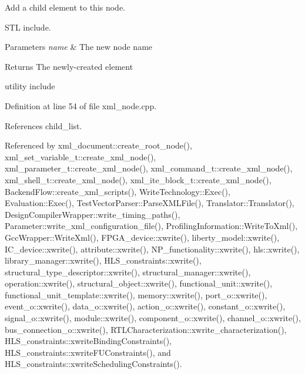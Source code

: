 Add a child element to this node. 

S\+TL include.


\begin{DoxyParams}{Parameters}
{\em name} & The new node name \\
\hline
\end{DoxyParams}
\begin{DoxyReturn}{Returns}
The newly-\/created element
\end{DoxyReturn}
utility include 

Definition at line 54 of file xml\+\_\+node.\+cpp.



References child\+\_\+list.



Referenced by xml\+\_\+document\+::create\+\_\+root\+\_\+node(), xml\+\_\+set\+\_\+variable\+\_\+t\+::create\+\_\+xml\+\_\+node(), xml\+\_\+parameter\+\_\+t\+::create\+\_\+xml\+\_\+node(), xml\+\_\+command\+\_\+t\+::create\+\_\+xml\+\_\+node(), xml\+\_\+shell\+\_\+t\+::create\+\_\+xml\+\_\+node(), xml\+\_\+ite\+\_\+block\+\_\+t\+::create\+\_\+xml\+\_\+node(), Backend\+Flow\+::create\+\_\+xml\+\_\+scripts(), Write\+Technology\+::\+Exec(), Evaluation\+::\+Exec(), Test\+Vector\+Parser\+::\+Parse\+X\+M\+L\+File(), Translator\+::\+Translator(), Design\+Compiler\+Wrapper\+::write\+\_\+timing\+\_\+paths(), Parameter\+::write\+\_\+xml\+\_\+configuration\+\_\+file(), Profiling\+Information\+::\+Write\+To\+Xml(), Gcc\+Wrapper\+::\+Write\+Xml(), F\+P\+G\+A\+\_\+device\+::xwrite(), liberty\+\_\+model\+::xwrite(), I\+C\+\_\+device\+::xwrite(), attribute\+::xwrite(), N\+P\+\_\+functionality\+::xwrite(), hls\+::xwrite(), library\+\_\+manager\+::xwrite(), H\+L\+S\+\_\+constraints\+::xwrite(), structural\+\_\+type\+\_\+descriptor\+::xwrite(), structural\+\_\+manager\+::xwrite(), operation\+::xwrite(), structural\+\_\+object\+::xwrite(), functional\+\_\+unit\+::xwrite(), functional\+\_\+unit\+\_\+template\+::xwrite(), memory\+::xwrite(), port\+\_\+o\+::xwrite(), event\+\_\+o\+::xwrite(), data\+\_\+o\+::xwrite(), action\+\_\+o\+::xwrite(), constant\+\_\+o\+::xwrite(), signal\+\_\+o\+::xwrite(), module\+::xwrite(), component\+\_\+o\+::xwrite(), channel\+\_\+o\+::xwrite(), bus\+\_\+connection\+\_\+o\+::xwrite(), R\+T\+L\+Characterization\+::xwrite\+\_\+characterization(), H\+L\+S\+\_\+constraints\+::xwrite\+Binding\+Constraints(), H\+L\+S\+\_\+constraints\+::xwrite\+F\+U\+Constraints(), and H\+L\+S\+\_\+constraints\+::xwrite\+Scheduling\+Constraints().

